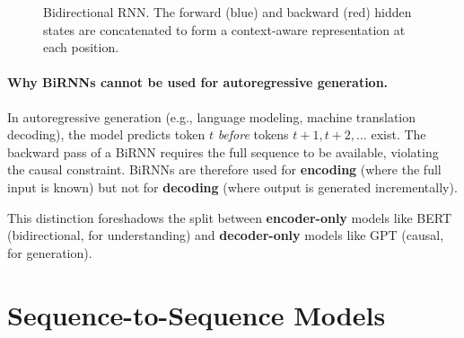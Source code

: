 \begin{figure}[H]
\caption{Bidirectional RNN.  The forward (blue) and backward (red) hidden
states are concatenated to form a context-aware representation at each
position.}
\label{fig:birnn}
\end{figure}

\paragraph{Why BiRNNs cannot be used for autoregressive generation.}
In autoregressive generation (e.g., language modeling, machine translation
decoding), the model predicts token $t$ \emph{before} tokens $t+1, t+2,
\ldots$ exist.  The backward pass of a BiRNN requires the full sequence to
be available, violating the causal constraint.  BiRNNs are therefore used
for \textbf{encoding} (where the full input is known) but not for
\textbf{decoding} (where output is generated incrementally).

This distinction foreshadows the split between \textbf{encoder-only}
models like BERT (bidirectional, for understanding) and
\textbf{decoder-only} models like GPT (causal, for generation).


\section{Sequence-to-Sequence Models}
\label{sec:seq2seq}

